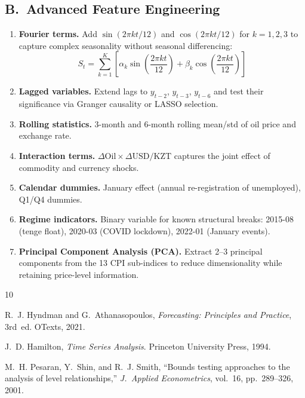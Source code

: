 \documentclass[12pt,a4paper]{article}
\begin{document}
\begin{table}[H]
\begin{table}[H]
\subsection*{B.~Advanced Feature Engineering}

\begin{enumerate}
    \item \textbf{Fourier terms.} Add $\sin(2\pi k t/12)$ and
          $\cos(2\pi k t/12)$ for $k = 1, 2, 3$ to capture complex
          seasonality without seasonal differencing:
          $$S_t = \sum_{k=1}^{K} \left[\alpha_k \sin\!\left(\frac{2\pi k t}{12}\right)
          + \beta_k \cos\!\left(\frac{2\pi k t}{12}\right)\right]$$
    \item \textbf{Lagged variables.} Extend lags to $y_{t-2}$,
          $y_{t-3}$, $y_{t-6}$ and test their significance via
          Granger causality or LASSO selection.
    \item \textbf{Rolling statistics.} 3-month and 6-month rolling
          mean/std of oil price and exchange rate.
    \item \textbf{Interaction terms.} $\Delta\text{Oil} \times \Delta\text{USD/KZT}$
          captures the joint effect of commodity and currency shocks.
    \item \textbf{Calendar dummies.} January effect (annual re-registration
          of unemployed), Q1/Q4 dummies.
    \item \textbf{Regime indicators.} Binary variable for known structural
          breaks: 2015-08 (tenge float), 2020-03 (COVID lockdown),
          2022-01 (January events).
    \item \textbf{Principal Component Analysis (PCA).} Extract 2--3
          principal components from the 13 CPI sub-indices to reduce
          dimensionality while retaining price-level information.
\end{enumerate}


\begin{thebibliography}{10}

R.~J. Hyndman and G.~Athanasopoulos,
\textit{Forecasting: Principles and Practice}, 3rd~ed.
OTexts, 2021.

J.~D. Hamilton,
\textit{Time Series Analysis}.
Princeton University Press, 1994.

M.~H. Pesaran, Y.~Shin, and R.~J. Smith,
``Bounds testing approaches to the analysis of level relationships,''
\textit{J.\ Applied Econometrics}, vol.~16, pp.~289--326, 2001.


\end{thebibliography}
\end{table}
\end{table}
\end{document}

